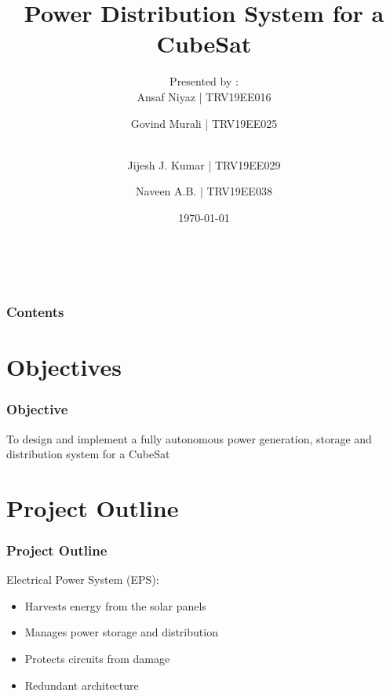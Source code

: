 \documentclass[aspectratio=169]{beamer}
\begin{document}
	\title{Power Distribution System for a CubeSat}
	
	\subtitle{}
	
	
	\author{Presented by :\\Ansaf Niyaz | TRV19EE016  \and Govind Murali | TRV19EE025  \and \\Jijesh J. Kumar | TRV19EE029  \and Naveen A.B. | TRV19EE038}
	
	\date{\today}
	
	
	{%
		\hbox{%
			\hbox{\insertslidenavigationsymbol}
			\hbox{\insertframenavigationsymbol}
			\hbox{\insertsubsectionnavigationsymbol}
			\hbox{\insertsectionnavigationsymbol}
			\hbox{\insertdocnavigationsymbol}
			\hbox{\insertbackfindforwardnavigationsymbol}}%
	}
	\begin{frame}[plain]
		\maketitle
	\end{frame}
	
	
	\begin{frame}
		\frametitle{Contents}
		
		
		
		
		\tableofcontents
	\end{frame}
	
	
	
	\section{Objectives}
	\begin{frame}
		
		\frametitle{Objective}
		To design and implement a fully autonomous power generation, storage and distribution system for a CubeSat 
		
		
		
	\end{frame}
	
	
	
	
	\section{Project Outline}
	
	
	\begin{frame}
		\frametitle{Project Outline}
		Electrical Power System (EPS):
		\begin{itemize}
			
			\item Harvests energy from the solar panels
			\item Manages power storage and distribution
			\item Protects circuits from damage
			\item Redundant architecture
		\end{itemize}
	\end{frame}
	
\end{document}

